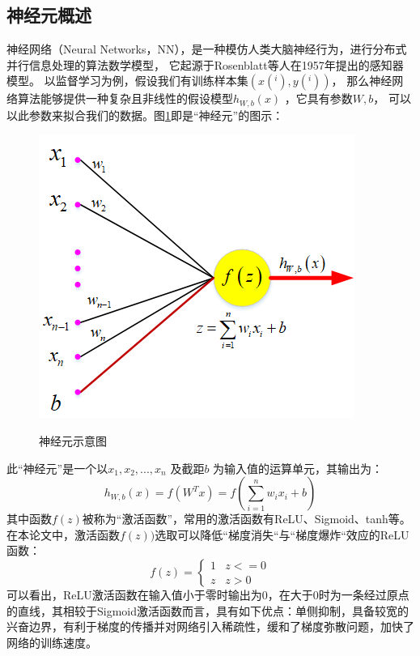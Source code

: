 \subsection{神经元概述}	
神经网络（Neural Networks，NN），是一种模仿人类大脑神经行为，进行分布式并行信息处理的算法数学模型，
它起源于Rosenblatt等人在1957年提出的感知器模型\cite{rosenblatt1958perceptron}。
以监督学习为例，假设我们有训练样本集$(x(^i), y(^i))$，
那么神经网络算法能够提供一种复杂且非线性的假设模型$h_{W,b}(x)$ ，它具有参数$W, b$，
可以以此参数来拟合我们的数据。图\ref{fig_2_1}即是“神经元”的图示：\par
\begin{figure}[htbp]
	\centering
	\includegraphics[scale=0.9]{figures/chapter_2/fig_2_1.png}\\
	\caption{神经元示意图}\label{fig_2_1}
\end{figure}
此“神经元”是一个以$x_1, x_2, ..., x_n$ 及截距$b$ 为输入值的运算单元，其输出为：
\begin{equation}
	h_{W,b}(x) = f(W^Tx) = f(\sum_{i=1}^n w_{i}x_i +b)
\end{equation} 
其中函数$f(z)$被称为“激活函数”，常用的激活函数有ReLU、Sigmoid、tanh等。在本论文中，激活函数$f(z))$选取可以降低``梯度消失``与``梯度爆炸``效应的ReLU函数\cite{glorot2011deep}\cite{krizhevsky2012imagenet}\cite{maas2013rectifier}：
\begin{equation}
	f(z) = 
	\begin{cases}
		1 & z <=0\\
		z & z > 0
	\end{cases}
\end{equation}
可以看出，ReLU激活函数在输入值小于零时输出为0，在大于0时为一条经过原点的直线，其相较于Sigmoid激活函数而言，具有如下优点：单侧抑制，具备较宽的兴奋边界，有利于梯度的传播并对网络引入稀疏性，缓和了梯度弥散问题，加快了网络的训练速度。\par
